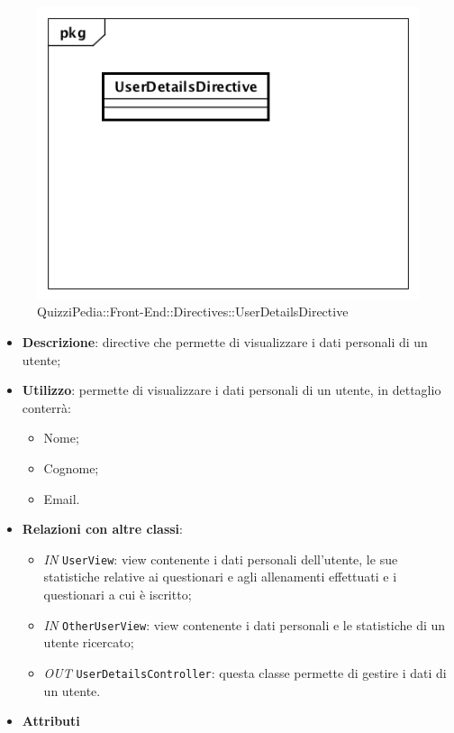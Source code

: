 \label{QuizziPedia::Front-End::Directives::UserDetailsDirective}

\begin{figure}[h]
	\centering
	\includegraphics[scale=0.5,keepaspectratio]{UML/Classi/Front-End/QuizziPedia_Front-end_Directives_UserDetailsDirective.png}
	\caption{QuizziPedia::Front-End::Directives::UserDetailsDirective}
\end{figure}

\begin{itemize}
	\item \textbf{Descrizione}: directive che permette di visualizzare i dati personali di un utente;
	\item \textbf{Utilizzo}: permette di visualizzare i dati personali di un utente, in dettaglio conterrà:
	\begin{itemize}
		\item Nome;
		\item Cognome;
		\item Email.
	\end{itemize}
	\item \textbf{Relazioni con altre classi}:
	\begin{itemize}
		\item \textit{IN} \texttt{UserView}: view contenente i dati personali dell'utente, le sue statistiche relative ai questionari e agli allenamenti effettuati e i questionari a cui è iscritto;
		\item \textit{IN} \texttt{OtherUserView}: view contenente i dati personali e le statistiche di un utente ricercato;
		\item \textit{OUT} \texttt{UserDetailsController}: questa classe permette di gestire i dati di un utente.
	\end{itemize}
	\item \textbf{Attributi}
\end{itemize}

